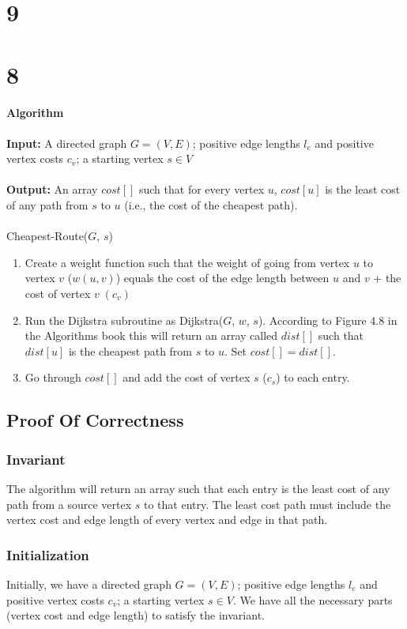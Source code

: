 \documentclass[12pt]{article}
\begin{document}
\section*{9}
\section*{8}
{\selectfont
\textbf{Algorithm}\\
\\
\textbf{Input:} A directed graph $G=(V,E)$; positive edge lengths $l_e$ and positive vertex costs $c_v$; a starting vertex $s \in V$\\
\\
\textbf{Output:} An array $cost[]$ such that for every vertex $u$, $cost[u]$ is the least cost of any path from $s$ to $u$ (i.e., the cost of the cheapest path).\\
\\
Cheapest-Route($G$, $s$)\\
\begin{enumerate}
\item Create a weight function such that the weight of going from vertex $u$ to vertex $v$ ($w(u,v)$) equals the cost of the edge length between $u$ and $v$ + the cost of vertex $v\;(c_v)$
\item Run the Dijkstra subroutine as Dijkstra($G$, $w$, $s$).  According to Figure 4.8 in the Algorithms book this will return an array called $dist[]$ such that $dist[u]$ is the cheapest path from $s$ to $u$.  Set $cost[] = dist[]$.
\item Go through $cost[]$ and add the cost of vertex $s$ ($c_s$) to each entry. 
\end{enumerate}
}

\subsection*{Proof Of Correctness}
\subsubsection*{Invariant}
The algorithm will return an array such that each entry is the least cost of any path from a source vertex $s$ to that entry.  The least cost path must include the vertex cost and edge length of every vertex and edge in that path.\\
\subsubsection*{Initialization}
Initially, we have a directed graph $G=(V,E)$; positive edge lengths $l_e$ and positive vertex costs $c_v$; a starting vertex $s \in V$.  We have all the necessary parts (vertex cost and edge length) to satisfy the invariant.\\
\end{document}
